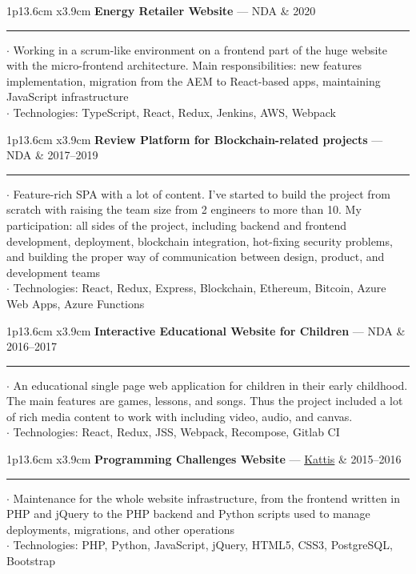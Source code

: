\documentclass[10pt,A4]{article}
\newcommand{\cvevent}[5]
{
  \begin{minipage}{\textwidth}
  \begin{tabular*}{1\textwidth}{p{13.6cm}  x{3.9cm}}
  	\textbf{#2} — \textcolor{bgcol}{#3} &   \vspace{2.5pt}\textcolor{sectcol}{#1}
  \end{tabular*}

  \vspace{-8pt}
    \textcolor{softcol}{\hrule}
  \vspace{6pt}

  $\cdot$ #4\\[3pt]
  $\cdot$ #5\\[6pt]
  \end{minipage}
}
\newcommand{\mystrut}{\rule[-.3\baselineskip]{0pt}{\baselineskip}}
\begin{document}

%
\cvevent{2020}
{Energy Retailer Website}
{NDA}
{Working in a scrum-like environment on a frontend part of the huge website with the micro-frontend architecture.
  Main responsibilities: new features implementation, migration from the AEM to React-based apps, maintaining JavaScript infrastructure}
{Technologies: TypeScript, React, Redux, Jenkins, AWS, Webpack}


%
\cvevent{2017–2019}
{Review Platform for Blockchain-related projects}
{NDA}
{Feature-rich SPA with a lot of content.
  I've started to build the project from scratch with raising the team size from 2 engineers to more than 10.
  My participation: all sides of the project, including backend and frontend development,
  deployment, blockchain integration, hot-fixing security problems, and building the proper way of communication
  between design, product, and development teams}
{Technologies: React, Redux, Express, Blockchain, Ethereum, Bitcoin, Azure Web Apps, Azure Functions}


%
\cvevent{2016–2017}
{Interactive Educational Website for Children}
{NDA}
{An educational single page web application for children in their early childhood.
  The main features are games, lessons, and songs.
  Thus the project included a lot of rich media content to work with including video, audio, and canvas.}
{Technologies: React, Redux, JSS, Webpack, Recompose, Gitlab CI}


%
\cvevent{2015–2016}
{Programming Challenges Website}
{\href{https://open.kattis.com/}{Kattis}}
{Maintenance for the whole website infrastructure, from the frontend written in PHP and jQuery
  to the PHP backend and Python scripts used to manage deployments, migrations, and other operations}
{Technologies: PHP, Python, JavaScript, jQuery, HTML5, CSS3, PostgreSQL, Bootstrap}


\null
\vspace*{\fill}
\hspace{-0.25\linewidth}\colorbox{white}{\makebox[1.5\linewidth][c]{\mystrut  \textnormal{\textcolor{sectcol}{\href{https://github.com/102}{github.com/102}}}}}




%
%
%
%
%
%
\end{document}
